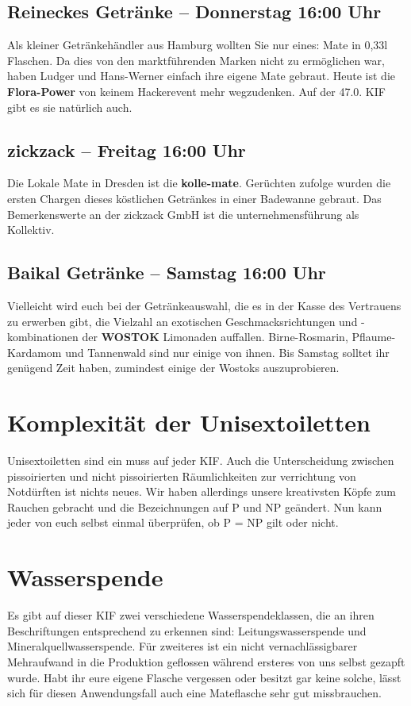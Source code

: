 \subsection*{Reineckes Getränke -- Donnerstag 16:00 Uhr}
Als kleiner Getränkehändler aus Hamburg wollten Sie nur eines: Mate in 0,33l Flaschen.
Da dies von den marktführenden Marken nicht zu ermöglichen war, haben Ludger und Hans-Werner einfach ihre eigene Mate gebraut.
Heute ist die \textbf{Flora-Power} von keinem Hackerevent mehr wegzudenken.
Auf der 47.0. KIF gibt es sie natürlich auch.

\subsection*{zickzack -- Freitag 16:00 Uhr}
Die Lokale Mate in Dresden ist die \textbf{kolle-mate}.
Gerüchten zufolge wurden die ersten Chargen dieses köstlichen Getränkes in einer Badewanne gebraut.
Das Bemerkenswerte an der zickzack GmbH ist die unternehmensführung als Kollektiv.

\subsection*{Baikal Getränke -- Samstag 16:00 Uhr}
Vielleicht wird euch bei der Getränkeauswahl, die es in der Kasse des Vertrauens zu erwerben gibt, die Vielzahl an exotischen Geschmacksrichtungen und -kombinationen der \textbf{WOSTOK} Limonaden auffallen.
Birne-Rosmarin, Pflaume-Kardamom und Tannenwald sind nur einige von ihnen.
Bis Samstag solltet ihr genügend Zeit haben, zumindest einige der Wostoks auszuprobieren.

\section*{Komplexität der Unisextoiletten}
Unisextoiletten sind ein muss auf jeder KIF. Auch die Unterscheidung zwischen pissoirierten und nicht pissoirierten Räumlichkeiten zur verrichtung von Notdürften ist nichts neues.
Wir haben allerdings unsere kreativsten Köpfe zum Rauchen gebracht und die Bezeichnungen auf P und NP geändert.
Nun kann jeder von euch selbst einmal überprüfen, ob P = NP gilt oder nicht.

\section*{Wasserspende}
Es gibt auf dieser KIF zwei verschiedene Wasserspendeklassen, die an ihren Beschriftungen entsprechend zu erkennen sind: Leitungswasserspende und Mineralquellwasserspende.
Für zweiteres ist ein nicht vernachlässigbarer Mehraufwand in die Produktion geflossen während ersteres von uns selbst gezapft wurde.
Habt ihr eure eigene Flasche vergessen oder besitzt gar keine solche, lässt sich für diesen Anwendungsfall auch eine Mateflasche sehr gut missbrauchen.

